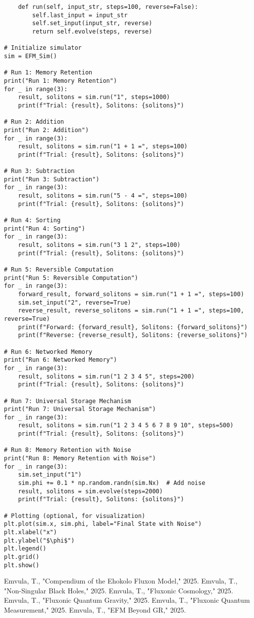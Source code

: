 \documentclass[11pt]{article}
\begin{document}
\begin{lstlisting}
    def run(self, input_str, steps=100, reverse=False):
        self.last_input = input_str
        self.set_input(input_str, reverse)
        return self.evolve(steps, reverse)

# Initialize simulator
sim = EFM_Sim()

# Run 1: Memory Retention
print("Run 1: Memory Retention")
for _ in range(3):
    result, solitons = sim.run("1", steps=1000)
    print(f"Trial: {result}, Solitons: {solitons}")

# Run 2: Addition
print("Run 2: Addition")
for _ in range(3):
    result, solitons = sim.run("1 + 1 =", steps=100)
    print(f"Trial: {result}, Solitons: {solitons}")

# Run 3: Subtraction
print("Run 3: Subtraction")
for _ in range(3):
    result, solitons = sim.run("5 - 4 =", steps=100)
    print(f"Trial: {result}, Solitons: {solitons}")

# Run 4: Sorting
print("Run 4: Sorting")
for _ in range(3):
    result, solitons = sim.run("3 1 2", steps=100)
    print(f"Trial: {result}, Solitons: {solitons}")

# Run 5: Reversible Computation
print("Run 5: Reversible Computation")
for _ in range(3):
    forward_result, forward_solitons = sim.run("1 + 1 =", steps=100)
    sim.set_input("2", reverse=True)
    reverse_result, reverse_solitons = sim.run("1 + 1 =", steps=100, reverse=True)
    print(f"Forward: {forward_result}, Solitons: {forward_solitons}")
    print(f"Reverse: {reverse_result}, Solitons: {reverse_solitons}")

# Run 6: Networked Memory
print("Run 6: Networked Memory")
for _ in range(3):
    result, solitons = sim.run("1 2 3 4 5", steps=200)
    print(f"Trial: {result}, Solitons: {solitons}")

# Run 7: Universal Storage Mechanism
print("Run 7: Universal Storage Mechanism")
for _ in range(3):
    result, solitons = sim.run("1 2 3 4 5 6 7 8 9 10", steps=500)
    print(f"Trial: {result}, Solitons: {solitons}")

# Run 8: Memory Retention with Noise
print("Run 8: Memory Retention with Noise")
for _ in range(3):
    sim.set_input("1")
    sim.phi += 0.1 * np.random.randn(sim.Nx)  # Add noise
    result, solitons = sim.evolve(steps=2000)
    print(f"Trial: {result}, Solitons: {solitons}")

# Plotting (optional, for visualization)
plt.plot(sim.x, sim.phi, label="Final State with Noise")
plt.xlabel("x")
plt.ylabel("$\phi$")
plt.legend()
plt.grid()
plt.show()
\end{lstlisting}




\begin{thebibliography}{9}
 Emvula, T., "Compendium of the Ehokolo Fluxon Model," 2025.
 Emvula, T., "Non-Singular Black Holes," 2025.
 Emvula, T., "Fluxonic Cosmology," 2025.
 Emvula, T., "Fluxonic Quantum Gravity," 2025.
 Emvula, T., "Fluxonic Quantum Measurement," 2025.
 Emvula, T., "EFM Beyond GR," 2025.
\end{thebibliography}
\end{document}
